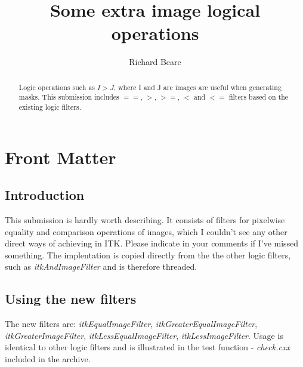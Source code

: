 \documentclass{InsightArticle}
\title{Some extra image logical operations}
\author{Richard Beare}
\begin{document}
\maketitle

\ifhtml
\chapter*{Front Matter\label{front}}
\fi


\begin{abstract}
\noindent
Logic operations such as $I > J$, where I and J are images are
useful when generating masks. This submission includes $==$, $>$,
$>=$, $<$ and $<=$ filters based on the existing logic
filters. 
\end{abstract}

\tableofcontents

\section{Introduction}
This submission is hardly worth describing. It consists of filters for
pixelwise equality and comparison operations of images, which I
couldn't see any other direct ways of achieving in ITK. Please
indicate in your comments if I've missed something. The implentation
is copied directly from the the other logic filters, such as {\em
itkAndImageFilter} and is therefore threaded.

\section{Using the new filters}
The new filters are: {\em itkEqualImageFilter}, {\em
itkGreaterEqualImageFilter}, {\em itkGreaterImageFilter}, {\em
itkLessEqualImageFilter}, {\em itkLessImageFilter}. Usage is identical
to other logic filters and is illustrated in the test function - {\em check.cxx}
included in the archive.
\end{document}
